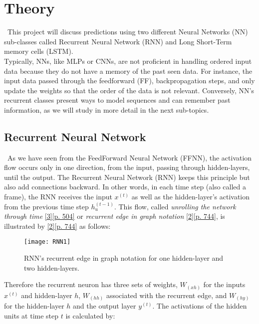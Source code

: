 \section{Theory}
\label{chap:Theory}

\quad \, This project will discuss predictions using two different Neural Networks (NN) sub-classes called Recurrent Neural Network (RNN) and Long Short-Term memory cells (LSTM).\\

Typically, NNs, like MLPs or CNNs, are not proficient in handling ordered input data because they do not have a memory of the past seen data. For instance, the input data passed through the feedforward (FF), backpropagation steps, and only update the weights so that the order of the data is not relevant. Conversely, NN's recurrent classes present ways to model sequences and can remember past information, as we will study in more detail in the next sub-topics.

\subsection{Recurrent Neural Network}
\label{chap:Recurrent Neural Network}

\quad \, As we have seen from the FeedForward Neural Network (FFNN), the activation flow occurs only in one direction, from the input, passing through hidden-layers, until the output. The Recurrent Neural Network (RNN) keeps this principle but also add connections backward. In other words, in each time step (also called a frame), the RNN receives the input $x^{(t)}$ as well as the hidden-layer's activation from the previous time step $h_u^{(t-1)}$. This flow, called \textit{unrolling the network through time} \hyperref[Bib:Aurelien Geron]{[3][p. 504]} or \textit{recurrent edge in graph notation} \hyperref[Bib:Sebastian Raschka, Vahid Mirjalili]{[2][p. 744]}, is illustrated by \hyperref[Bib:Sebastian Raschka, Vahid Mirjalili]{[2][p. 744]} as follows:

\begin{figure}[H]
\label{fig:RNN1}
\centering
\texttt{[image: RNN1]}
\caption{RNN's recurrent edge in graph notation for one hidden-layer and two hidden-layers.}
\end{figure}

Therefore the recurrent neuron has three sets of weights, $W_{(xh)}$ for the inputs $x^{(t)}$ and hidden-layer $h$, $W_{(hh)}$ associated with the recurrent edge, and $W_{(hy)}$ for the hidden-layer $h$ and the output layer $y^{(t)}$. The activations of the hidden units at time step $t$ is calculated by:\\

